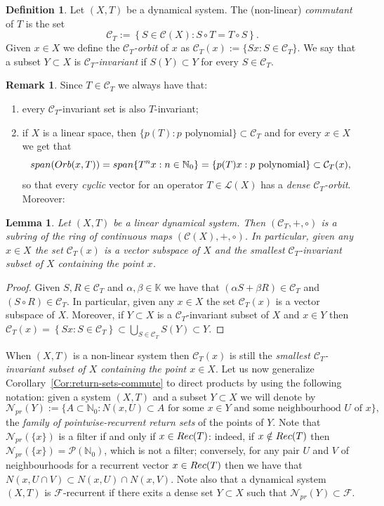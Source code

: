 \documentclass[openright,11pt]{article}
\theoremstyle{plain}
\newtheorem{lemma}[theorem]{Lemma}
\theoremstyle{definition}
\newtheorem{definition}[theorem]{Definition}
\newtheorem{remark}[theorem]{Remark}
\newcommand{\NN}{\mathbb{N}}
\newcommand{\KK}{\mathbb{K}}
\newcommand{\Ci}{\mathscr{C}}
\newcommand{\Fc}{\mathcal{F}}
\newcommand{\Lc}{\mathcal{L}}
\newcommand{\Nc}{\mathcal{N}}
\newcommand{\Part}{\mathscr{P}}
\newcommand{\Rec}{\textup{Rec}}
\newcommand{\Com}{\mathcal{C}}
\newcommand{\orb}{\textup{Orb}}
\newcommand{\lspan}{\textup{span}}
\begin{document}
\begin{definition}
	Let $(X,T)$ be a dynamical system. The (non-linear) {\em commutant} of $T$ is the set
	\[
	\Com_T := \left\{ S \in \Ci(X) : S \circ T = T \circ S \right\}.
	\]
	Given $x \in X$ we define the {\em $\Com_T$-orbit} of $x$ as $\Com_T(x) := \{ Sx : S \in \Com_T \}$. We say that a subset $Y \subset X$ is {\em $\Com_T$-invariant} if $S(Y) \subset Y$ for every $S \in \Com_T$.
\end{definition}

\begin{remark}
	Since $T \in \Com_T$ we always have that:
	\begin{enumerate}[--]
		\item every $\Com_T$-invariant set is also $T$-invariant;
		
		\item if $X$ is a linear space, then $\{ p(T) : p \text{ polynomial} \} \subset \Com_T$ and for every $x \in X$ we get that
		\[
		\lspan(\orb(x,T)) = \lspan\{T^nx : n \in \NN_0\} = \{ p(T)x : p \text{ polynomial} \} \subset \Com_T(x),
		\]
		so that every {\em cyclic} vector for an operator $T \in \Lc(X)$ has a {\em dense $\Com_T$-orbit}. Moreover:
	\end{enumerate}
\end{remark}

\begin{lemma}\label{Lem:Com_T-subspace}
	Let $(X,T)$ be a linear dynamical system. Then $(\Com_T,+,\circ)$ is a subring of the ring of continuous maps $(\Ci(X),+,\circ)$. In particular, given any $x \in X$ the set $\Com_T(x)$ is a vector subspace of $X$ and the smallest $\Com_T$-invariant subset of $X$ containing the point $x$.
\end{lemma}
\begin{proof}
	Given $S,R \in \Com_T$ and $\alpha,\beta \in \KK$ we have that $(\alpha S+\beta R) \in \Com_T$ and $(S \circ R) \in \Com_T$. In particular, given any $x \in X$ the set $\Com_T(x)$ is a vector subspace of $X$. Moreover, if $Y \subset X$ is a $\Com_T$-invariant subset of $X$ and $x \in Y$ then $\Com_T(x) = \left\{ Sx : S \in \Com_T \right\} \subset \bigcup_{S \in \Com_T} S(Y) \subset Y$.
\end{proof}

When $(X,T)$ is a non-linear system then $\Com_T(x)$ is still the {\em smallest $\Com_T$-invariant subset of $X$ containing the point $x \in X$}. Let us now generalize Corollary~\ref{Cor:return-sets-commute} to direct products by using the following notation: given a system $(X,T)$ and a subset $Y \subset X$ we will denote by
\[
\Nc_{pr}(Y) := \{ A \subset \NN_0 : N(x,U) \subset A \text{ for some } x \in Y \text{ and some neighbourhood } U \text{ of } x \},
\]
the {\em family of pointwise-recurrent return sets} of the points of $Y$. Note that $\Nc_{pr}(\{x\})$ is a filter if and only if $x \in \Rec(T)$: indeed, if $x \notin \Rec(T)$ then $\Nc_{pr}(\{x\})=\Part(\NN_0)$, which is not a filter; conversely, for any pair $U$ and $V$ of neighbourhoods for a recurrent vector $x \in \Rec(T)$ then we have that $N(x,U\cap V) \subset N(x,U) \cap N(x,V)$. Note also that a dynamical system $(X,T)$ is $\Fc$-recurrent if there exits a dense set $Y \subset X$ such that $\Nc_{pr}(Y) \subset \Fc$.
\end{document}

